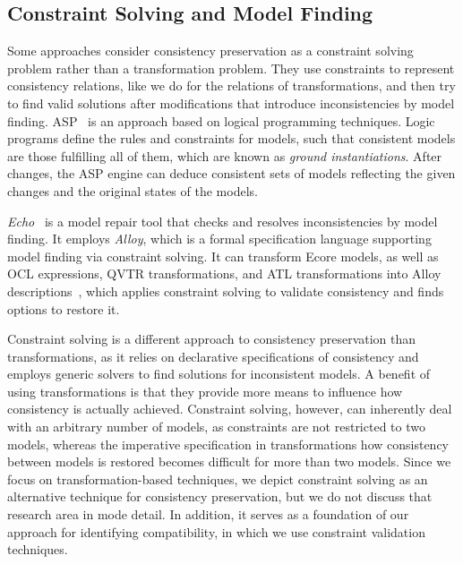 \subsection{Constraint Solving and Model Finding}

Some approaches consider consistency preservation as a constraint solving problem rather than a transformation problem.
They use constraints to represent consistency relations, like we do for the relations of transformations, and then try to find valid solutions after modifications that introduce inconsistencies by model finding.
\gls{ASP}~\cite{cicchetti2006asp-EDOCW,eramo2008asp-EDOCW} is an approach based on logical programming techniques.
Logic programs define the rules and constraints for models, such that consistent models are those fulfilling all of them, which are known as \emph{ground instantiations}.
After changes, the \gls{ASP} engine can deduce consistent sets of models reflecting the given changes and the original states of the models.

\emph{Echo}~\cite{macedo2013echo-ASE} is a model repair tool that checks and resolves inconsistencies by model finding.
It employs \emph{Alloy}, which is a formal specification language supporting model finding via constraint solving.
It can transform Ecore models, as well as \gls{OCL} expressions, \gls{QVTR} transformations, and \gls{ATL} transformations into Alloy descriptions~\cite{macedo2013qvtrAlloy-FASE, macedo2016qvtAtlAlloy-SoSym}, which applies constraint solving to validate consistency and finds options to restore it.

Constraint solving is a different approach to consistency preservation than transformations, as it relies on declarative specifications of consistency and employs generic solvers to find solutions for inconsistent models.
A benefit of using transformations is that they provide more means to influence how consistency is actually achieved.
Constraint solving, however, can inherently deal with an arbitrary number of models, as constraints are not restricted to two models, whereas the imperative specification in transformations how consistency between models is restored becomes difficult for more than two models.
Since we focus on transformation-based techniques, we depict constraint solving as an alternative technique for consistency preservation, but we do not discuss that research area in mode detail.
In addition, it serves as a foundation of our approach for identifying compatibility, in which we use constraint validation techniques.



